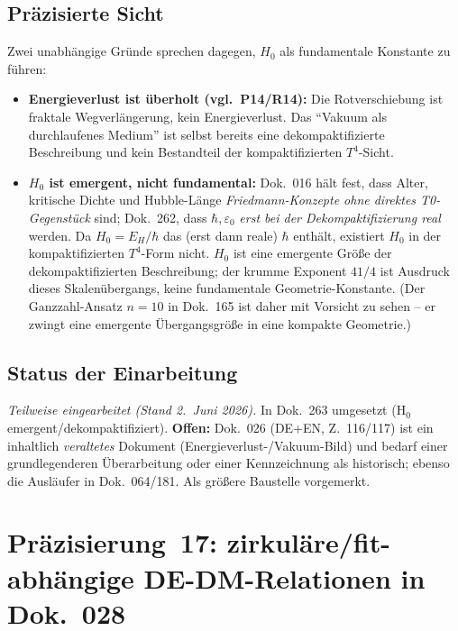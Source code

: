 \subsection*{Präzisierte Sicht}

Zwei unabhängige Gründe sprechen dagegen, $H_0$ als fundamentale Konstante zu
führen:
\begin{itemize}
  \item \textbf{Energieverlust ist überholt (vgl.\ P14/R14):} Die
        Rotverschiebung ist fraktale Wegverlängerung, kein Energieverlust. Das
        \enquote{Vakuum als durchlaufenes Medium} ist selbst bereits eine
        dekompaktifizierte Beschreibung und kein Bestandteil der
        kompaktifizierten $T^4$-Sicht.
  \item \textbf{$H_0$ ist emergent, nicht fundamental:} Dok.~016 hält fest,
        dass Alter, kritische Dichte und Hubble-Länge \emph{Friedmann-Konzepte
        ohne direktes T0-Gegenstück} sind; Dok.~262, dass $\hbar, \varepsilon_0$
        \emph{erst bei der Dekompaktifizierung real} werden. Da $H_0 = E_H/\hbar$
        das (erst dann reale) $\hbar$ enthält, existiert $H_0$ in der
        kompaktifizierten $T^4$-Form nicht. $H_0$ ist eine emergente Größe der
        dekompaktifizierten Beschreibung; der krumme Exponent $41/4$ ist
        Ausdruck dieses Skalenübergangs, keine fundamentale Geometrie-Konstante.
        (Der Ganzzahl-Ansatz $n=10$ in Dok.~165 ist daher mit Vorsicht zu sehen
        -- er zwingt eine emergente Übergangsgröße in eine kompakte Geometrie.)
\end{itemize}

\subsection*{Status der Einarbeitung}

\emph{Teilweise eingearbeitet (Stand 2.~Juni 2026).} In Dok.~263 umgesetzt
(H$_0$ emergent/dekompaktifiziert). \textbf{Offen:} Dok.~026 (DE+EN, Z.~116/117)
ist ein inhaltlich \emph{veraltetes} Dokument (Energieverlust-/Vakuum-Bild) und
bedarf einer grundlegenderen Überarbeitung oder einer Kennzeichnung als
historisch; ebenso die Ausläufer in Dok.~064/181. Als größere Baustelle
vorgemerkt.

\section{\texorpdfstring{Präzisierung~17: zirkuläre/fit-abhängige DE-DM-Relationen in Dok.~028}{Praezisierung 17: zirkulaere DE-DM-Relationen in Dok 028}}

